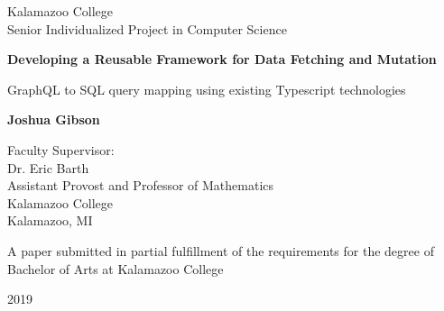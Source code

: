 \documentclass[12pt]{article}
\begin{document}
\begin{titlepage}
   \begin{center}
        Kalamazoo College\\
        Senior Individualized Project in Computer Science
       \vspace*{3cm}
 
       \textbf{Developing a Reusable Framework for Data Fetching and Mutation}
 
       \vspace{0.5cm}
       GraphQL to SQL query mapping using existing Typescript technologies
 
       \vspace{1.5cm}
 
       \textbf{Joshua Gibson}
 
       \vspace{4cm}
 
       Faculty Supervisor:\\
       Dr. Eric Barth\\
       Assistant Provost and Professor of Mathematics\\
       Kalamazoo College\\
       Kalamazoo, MI
       
       \vspace{3cm}
       
       A paper submitted in partial fulfillment of the requirements for the degree of Bachelor of Arts at Kalamazoo College
       
       \vspace{2cm}
       2019
 
   \end{center}
\end{titlepage}


\null \newpage


\setcounter{page}{2}

\doublespacing


\newpage


\newpage
\singlespacing
\tableofcontents
\doublespacing
\newpage

\listoffigures
\newpage

















\newpage
\setcounter{page}{1}


\newpage
\printbibliography
{}
%
%
\end{document}
